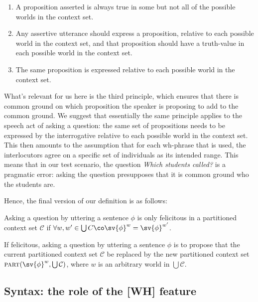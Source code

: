 \begin{enumerate}[1.]
  \item A proposition asserted is always true in some but not all of the
        possible worlds in the context set.
  \item Any assertive utterance should express a proposition, relative to each
        possible world in the context set, and that proposition should have a
        truth-value in each possible world in the context set.
  \item The same proposition is expressed relative to each possible world in the
        context set.
\end{enumerate}
%
What's relevant for us here is the third principle, which ensures that there is
common ground on which proposition the speaker is proposing to add to the common
ground. We suggest that essentially the same principle applies to the speech act
of asking a question: the same set of propositions needs to be expressed by the
interrogative relative to each possible world in the context set. This then
amounts to the assumption that for each wh-phrase that is used, the
interlocutors agree on a specific set of individuals as its intended range. This
means that in our test scenario, the question \emph{Which students called?} is a
pragmatic error: asking the question presupposes that it is common ground who
the students are.

Hence, the final version of our definition is as follows:

\begin{definition}%
  \label{def:update-by-question-final}%
  Asking a question by uttering a sentence $\phi$ is only felicitous in a
  partitioned context set $\mathcal{C}$ if
  $\forall w,w'\in \bigcup C\co \sv{\phi}^{w}=\sv{\phi}^{w'}$.

  If felicitous, asking a question by uttering a sentence $\phi$ is to propose
  that the current partitioned context set $\mathcal{C}$ be replaced by the new
  partitioned context set $\textsc{part}(\sv{\phi}^{w},\bigcup \mathcal{C})$,
  where $w$ is an arbitrary world in $\bigcup \mathcal{C}$.
\end{definition}



\subsection{Syntax: the role of the [WH] feature}
\label{sec:wh-syntax}

